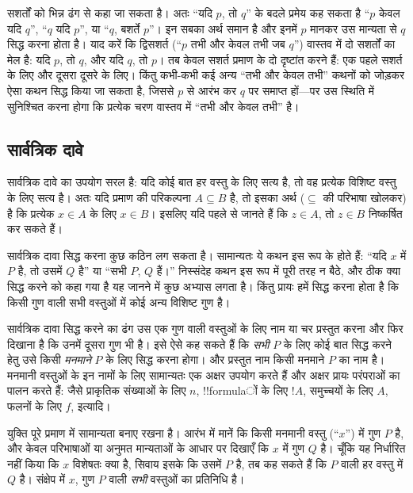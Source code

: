 \documentclass[../../../include/open-logic-section]{subfiles}
\begin{document}
सशर्तों को भिन्न ढंग से कहा जा सकता है। अतः ``यदि $p$, तो $q$'' के बदले
प्रमेय कह सकता है ``$p$ केवल यदि $q$'', ``$q$ यदि $p$'', या ``$q$, बशर्ते
$p$''। इन सबका अर्थ समान है और इनमें $p$ मानकर उस मान्यता से $q$ सिद्ध करना
होता है। याद करें कि द्विसशर्त (``$p$ तभी और केवल तभी जब $q$'') वास्तव में
दो सशर्तों का मेल है: यदि $p$, तो $q$, और यदि $q$, तो $p$। तब केवल सशर्त
प्रमाण के दो दृष्टांत करने हैं: एक पहले सशर्त के लिए और दूसरा दूसरे के लिए।
किंतु कभी-कभी कई अन्य ``तभी और केवल तभी'' कथनों को जोड़कर ऐसा कथन सिद्ध किया
जा सकता है, जिससे $p$ से आरंभ कर $q$ पर समाप्त हों---पर उस स्थिति में
सुनिश्चित करना होगा कि प्रत्येक चरण वास्तव में ``तभी और केवल तभी'' है।

\subsection{सार्वत्रिक दावे}

सार्वत्रिक दावे का उपयोग सरल है: यदि कोई बात हर वस्तु के लिए सत्य है, तो
वह प्रत्येक विशिष्ट वस्तु के लिए सत्य है। अतः यदि प्रमाण की परिकल्पना
$A\subseteq B$ है, तो इसका अर्थ ($\subseteq$ की परिभाषा खोलकर) है कि
प्रत्येक $x\in A$ के लिए $x\in B$। इसलिए यदि पहले से जानते हैं कि $z\in A$,
तो $z\in B$ निष्कर्षित कर सकते हैं।

सार्वत्रिक दावा सिद्ध करना कुछ कठिन लग सकता है। सामान्यतः ये कथन इस रूप के
होते हैं: ``यदि $x$ में $P$ है, तो उसमें $Q$ है'' या ``सभी $P$, $Q$ हैं।''
निस्संदेह कथन इस रूप में पूरी तरह न बैठे, और ठीक क्या सिद्ध करने को कहा गया
है यह जानने में कुछ अभ्यास लगता है। किंतु प्रायः हमें सिद्ध करना होता है कि
किसी गुण वाली सभी वस्तुओं में कोई अन्य विशिष्ट गुण है।

सार्वत्रिक दावा सिद्ध करने का ढंग उस एक गुण वाली वस्तुओं के लिए नाम या चर
प्रस्तुत करना और फिर दिखाना है कि उनमें दूसरा गुण भी है। इसे ऐसे कह सकते हैं
कि \emph{सभी} $P$ के लिए कोई बात सिद्ध करने हेतु उसे किसी \emph{मनमाने} $P$
के लिए सिद्ध करना होगा। और प्रस्तुत नाम किसी मनमाने $P$ का नाम है। मनमानी
वस्तुओं के इन नामों के लिए सामान्यतः एक अक्षर उपयोग करते हैं और अक्षर प्रायः
परंपराओं का पालन करते हैं: जैसे प्राकृतिक संख्याओं के लिए $n$, !!{formula}ों
के लिए $!A$, समुच्चयों के लिए $A$, फलनों के लिए $f$, इत्यादि।

युक्ति पूरे प्रमाण में सामान्यता बनाए रखना है। आरंभ में मानें कि किसी मनमानी
वस्तु (``$x$'') में गुण $P$ है, और केवल परिभाषाओं या अनुमत मान्यताओं के
आधार पर दिखाएँ कि $x$ में गुण $Q$ है। चूँकि यह निर्धारित नहीं किया कि $x$
विशेषतः क्या है, सिवाय इसके कि उसमें $P$ है, तब कह सकते हैं कि $P$ वाली हर
वस्तु में $Q$ है। संक्षेप में $x$, गुण $P$ वाली \emph{सभी} वस्तुओं का
प्रतिनिधि है।
\end{document}
